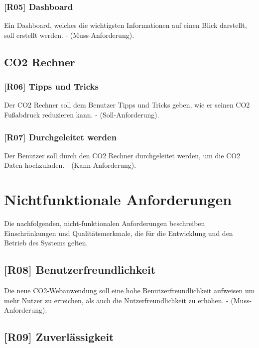 \subsubsection{[R05] Dashboard}

Ein Dashboard, welches die wichtigsten Informationen auf einen Blick darstellt, soll erstellt werden. - (Muss-Anforderung).

\subsection{CO2 Rechner}

\subsubsection{[R06] Tipps und Tricks}

Der CO2 Rechner soll dem Benutzer Tipps und Tricks geben, wie er seinen CO2 Fußabdruck reduzieren kann. - (Soll-Anforderung).

\subsubsection{[R07] Durchgeleitet werden}

Der Benutzer soll durch den CO2 Rechner durchgeleitet werden, um die CO2 Daten hochzuladen. - (Kann-Anforderung).

\section{Nichtfunktionale Anforderungen}
\label{chapter:3-section:nichtfunktionale-anforderungen}

Die nachfolgenden, nicht-funktionalen Anforderungen beschreiben Einschränkungen und Qualitätsmerkmale, die für die Entwicklung und den Betrieb des Systems gelten.

\subsection{[R08] Benutzerfreundlichkeit}

Die neue CO2-Webanwendung soll eine hohe Benutzerfreundlichkeit aufweisen um mehr Nutzer zu erreichen, als auch die Nutzerfreundlichkeit zu erhöhen. - (Muss-Anforderung).

\subsection{[R09] Zuverlässigkeit}

